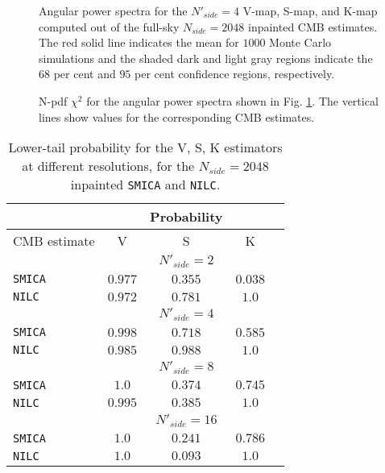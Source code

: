 \begin{figure}
\centering
\caption{Angular power spectra for the $N'_{side} = 4$ V-map, S-map, and K-map computed out of the full-sky $N_{side} = 2048$ inpainted CMB estimates. The red solid line indicates the mean for $1000$ Monte Carlo simulations and the shaded dark and light gray regions indicate the $68$ per cent and $95$ per cent confidence regions, respectively.}
\label{Fig:1}
\end{figure}

\begin{figure}
\centering
\caption{N-pdf $\chi^ 2$ for the angular power spectra shown in Fig. \ref{Fig:1}. The vertical lines show values for the corresponding CMB estimates.}
\label{Fig:2}
\end{figure}

\begin{table}
\centering
\caption{Lower-tail probability for the V, S, K estimators at different resolutions, for the $N_{side} = 2048$ inpainted \texttt{SMICA} and \texttt{NILC}.}
\label{table:1}
\begin{tabular}{@{}lcccc}
\hline 
  & & Probability & \\
\hline  
CMB estimate & V & S & K \\ 
\hline  
 & & $N'_{side}=2$ & \\
\texttt{SMICA} & $0.977$ & $0.355$ & $0.038$ \\ 
\texttt{NILC} & $0.972$ & $0.781$ & $1.0$  \\
 & & $ N'_{side} = 4 $ & \\
\texttt{SMICA} & $0.998$ & $0.718$ & $0.585$ \\
\texttt{NILC} & $0.985$ & $0.988$ & $1.0$ \\
 & & $N'_{side} = 8$ & \\
 \texttt{SMICA} & $1.0$ & $0.374$ & $0.745$ \\
 \texttt{NILC} & $0.995$ & $0.385$ & $1.0$ \\
 & & $N'_{side} = 16$ & \\
 \texttt{SMICA} & $1.0$ & $0.241$ & $0.786$ \\
 \texttt{NILC} & $1.0$ & $0.093$ & $1.0$ \\
\end{tabular} 
\end{table}

